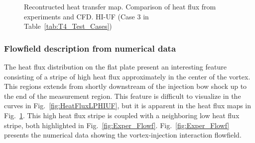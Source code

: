 \documentclass{AIAA}
\begin{document}
\begin{figure}[!h]
\center
\begin{adjustbox}{max width=1.1\columnwidth,center}
%
\end{adjustbox}
\caption{Recontructed heat transfer map. Comparison of heat flux from experiments and CFD. HI-UF (Case 3 in Table~\ref{tab:T4_Test_Cases})}
\label{fig:HeatFluxMap}
\end{figure} 


\subsubsection{Flowfield description from numerical data}

The heat flux distribution on the flat plate present an interesting feature consisting of a stripe of high heat flux approximately in the center of the vortex. This regions extends from shortly downstream of the injection bow shock up to the end of the measurement region. This feature is difficult to visualize in the curves in Fig.~\ref{fig:HeatFluxLPHIUF}, but it is apparent in the heat flux maps in Fig.~\ref{fig:HeatFluxMap}. This high heat flux stripe is coupled with a neighboring low heat flux stripe, both highlighted in Fig.~\ref{fig:Exper_Flowf}. Fig.~\ref{fig:Exper_Flowf} presents the numerical data showing the vortex-injection interaction flowfield. 
\end{document}

